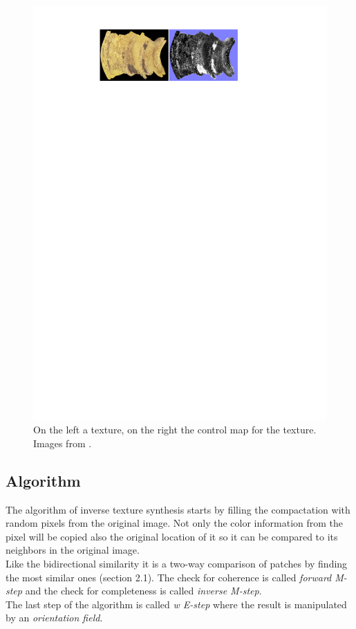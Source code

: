 \begin{figure}[h]
\centering
\includegraphics[scale=0.9]{img/controlmaps}
\caption[Control maps]{On the left a texture, on the right the control map for the texture.\\ Images from \cite{its}.}
\label{fig:Control maps}
\end{figure}


\subsection{Algorithm}
The algorithm of inverse texture synthesis starts by filling the compactation with random pixels from the original image. Not only the color information from the pixel will be copied also the original location of it so it can be compared to its neighbors in the original image.\\
Like the bidirectional similarity it is a two-way comparison of patches by finding the most similar ones (section 2.1). The check for coherence is called \textit{forward M-step} and the check for completeness is called \textit{inverse M-step}.\\
The last step of the algorithm is called \textit{w E-step} where the result is manipulated by an \textit{orientation field}.

